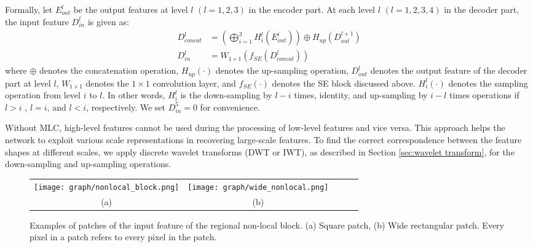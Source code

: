 \documentclass[a4paper,fleqn]{cas-dc}
\begin{document}
 
Formally, let $ E_{out}^{l}$ be the output features at level $l$ $(l=1,2,3)$ in the encoder part. At each level $l$  $(l=1,2,3,4)$ in the decoder part, the input feature $D_{in}^{l}$ is given as: 
\begin{align}\label{eq:MLC}
  D_{concat}^{l} &= (\bigoplus_{i=1}^{3} H_{i}^{l} ( E_{out}^{i} ) )\oplus H_{up}(D_{out}^{l+1})  \\
  D_{in}^{l} &= W_{1\times1} ( f_{SE} ( D_{concat}^{l}  )  )
\end{align}
where $\oplus$ denotes the concatenation operation, $H_{up}(\cdot)$ denotes the up-sampling operation, $D_{out}^{l}$ denotes the output feature of the decoder part at level $l$, $ W_{1\times1}$ denotes the $1\times1$ convolution layer, and $f_{SE}(\cdot)$ denotes the SE block discussed above. $H_{i}^{l}(\cdot)$ denotes the sampling operation from level $i$ to $l$. In other words, $H_{i}^{l}$ is the down-sampling by $l-i$ times, identity, and up-sampling by $i-l$ times operations if $l>i$ , $l=i$, and $l<i$, respectively. We set $ D_{in}^{5} = 0 $  for convenience.

 Without MLC, high-level features cannot be used during the processing of low-level features and vice versa. This approach helps the network to exploit various scale representations in recovering large-scale features. To find the correct correspondence between the feature shapes at different scales, we apply discrete wavelet transforms (DWT or IWT), as described in Section \ref{sec:wavelet transform}, for the down-sampling and up-sampling operations.




\begin{figure*}[!t]\footnotesize
	\centering
	\setlength{\tabcolsep}{0pt}
	
	\begin{tabular}{cclcclccl}
		\multicolumn{3}{c}{\texttt{[image: graph/nonlocal\_block.png]}}\hspace{10mm}\ &
		\multicolumn{3}{c}{\texttt{[image: graph/wide\_nonlocal.png]}}\\
		\multicolumn{3}{c}{(a)} &
		\multicolumn{3}{c}{(b)} 
	\end{tabular}
	\caption{Examples of patches of the input feature of the regional non-local block. (a) Square patch, (b) Wide rectangular patch. Every pixel in a patch refers to every pixel in the patch. } 
	\label{fig:nonlocal_block}
\end{figure*}
\end{document}
